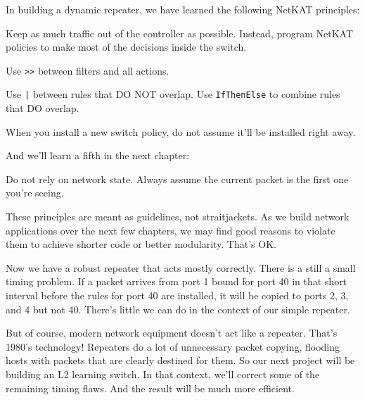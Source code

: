 In building a dynamic repeater, we have learned the following NetKAT principles:

\setcounter{principle}{0}

\begin{principle}
Keep as much traffic out of the controller as possible.
Instead, program NetKAT policies to make most of the decisions inside the switch.  
\end{principle}

\begin{principle}
Use \texttt{>>} between filters and all actions.
\end{principle}

\begin{principle}
Use \texttt{|} between rules that DO NOT overlap.
Use \texttt{IfThenElse} to combine rules that DO overlap. 
\end{principle}

\begin{principle}
When you install a new switch policy, do not assume it'll be installed right away.  
\end{principle}

And we'll learn a fifth in the next chapter:

\begin{principle}
Do not rely on network state.  Always assume the current packet is the first one you're seeing.   
\end{principle}

These principles are meant as guidelines, not straitjackets.
As we build network applications over the next few chapters, we may find good reasons to violate them 
to achieve shorter code or better modularity.
That's OK. 

Now we have a robust repeater that acts mostly correctly.  There is a still a small timing problem.  If a packet
arrives from port 1 bound for port 40 in that short interval before the rules for port 40 are installed, it
will be copied to ports 2, 3, and 4 but not 40.  There's little we can do in the context of our simple repeater.

But of course, modern network equipment doesn't act like a repeater.  That's 1980's technology!  Repeaters
do a lot of unnecessary packet copying, flooding hosts with packets that are clearly destined for them.  
So our next project will be building an L2 learning switch.  In that context, we'll correct some of the 
remaining timing flaws.  And the result will be much more efficient. 

